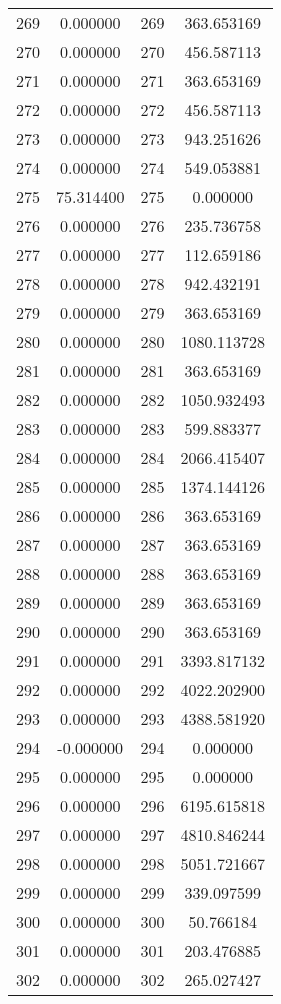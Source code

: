 \documentclass[12pt]{article}
\begin{document}
\begin{longtable}{@{}cccc@{}}
269 & 0.000000 & 269 & 363.653169 \\
270 & 0.000000 & 270 & 456.587113 \\
271 & 0.000000 & 271 & 363.653169 \\
272 & 0.000000 & 272 & 456.587113 \\
273 & 0.000000 & 273 & 943.251626 \\
274 & 0.000000 & 274 & 549.053881 \\
275 & 75.314400 & 275 & 0.000000 \\
276 & 0.000000 & 276 & 235.736758 \\
277 & 0.000000 & 277 & 112.659186 \\
278 & 0.000000 & 278 & 942.432191 \\
279 & 0.000000 & 279 & 363.653169 \\
280 & 0.000000 & 280 & 1080.113728 \\
281 & 0.000000 & 281 & 363.653169 \\
282 & 0.000000 & 282 & 1050.932493 \\
283 & 0.000000 & 283 & 599.883377 \\
284 & 0.000000 & 284 & 2066.415407 \\
285 & 0.000000 & 285 & 1374.144126 \\
286 & 0.000000 & 286 & 363.653169 \\
287 & 0.000000 & 287 & 363.653169 \\
288 & 0.000000 & 288 & 363.653169 \\
289 & 0.000000 & 289 & 363.653169 \\
290 & 0.000000 & 290 & 363.653169 \\
291 & 0.000000 & 291 & 3393.817132 \\
292 & 0.000000 & 292 & 4022.202900 \\
293 & 0.000000 & 293 & 4388.581920 \\
294 & -0.000000 & 294 & 0.000000 \\
295 & 0.000000 & 295 & 0.000000 \\
296 & 0.000000 & 296 & 6195.615818 \\
297 & 0.000000 & 297 & 4810.846244 \\
298 & 0.000000 & 298 & 5051.721667 \\
299 & 0.000000 & 299 & 339.097599 \\
300 & 0.000000 & 300 & 50.766184 \\
301 & 0.000000 & 301 & 203.476885 \\
302 & 0.000000 & 302 & 265.027427 \\

\end{longtable}
\end{document}
